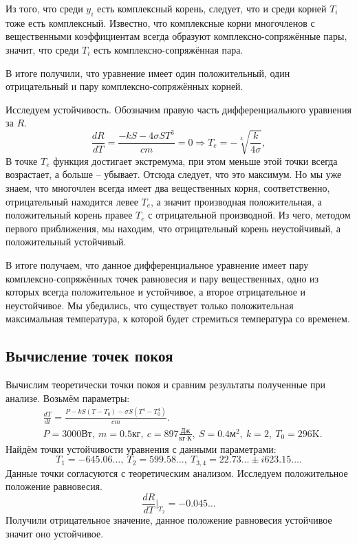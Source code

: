     Из того, что среди $ y_i $ есть комплексный корень, следует, что и среди корней $ T_i $ тоже есть комплексный. Известно, что комплексные корни многочленов с вещественными коэффициентам всегда образуют комплексно-сопряжённые пары, значит, что среди $ T_i $ есть комплексно-сопряжённая пара.

    В итоге получили, что уравнение имеет один положительный, один отрицательный и пару комплексно-сопряжённых корней.

    Исследуем устойчивость. Обозначим правую часть дифференциального уравнения за $ R $.
    \[
        \frac{dR}{dT} = \frac{-kS - 4\sigma S T^3}{cm} = 0 \Rightarrow T_e = -\sqrt[3]{\frac{k}{4 \sigma}},
    \]
    В точке $ T_e $ функция достигает экстремума, при этом меньше этой точки всегда возрастает, а больше -- убывает. Отсюда следует, что это максимум. Но мы уже знаем, что многочлен всегда имеет два вещественных корня, соответственно, отрицательный находится левее $ T_e $, а значит производная положительная, а положительный корень правее $ T_e $ с отрицательной производной. Из чего, методом первого приближения, мы находим, что отрицательный корень неустойчивый, а положительный устойчивый. 

    В итоге получаем, что данное дифференциальное уравнение имеет пару комплексно-сопряжённых точек равновесия и пару вещественных, одно из которых всегда положительное и устойчивое, а второе отрицательное и неустойчивое. Мы убедились, что существует только положительная максимальная температура, к которой будет стремиться температура со временем.

    \subsection{Вычисление точек покоя}
        Вычислим теоретически точки покоя и сравним результаты полученные при анализе. Возьмём параметры:
        \[
            \begin{split}
                & \frac{dT}{dt} = \frac{P - k S (T - T_0) - \sigma S (T^4 - T_0^4)}{cm}. \\
                & P = 3000 \text{Вт}, ~ m = 0.5 \text{кг}, ~ c = 897 \frac{\text{Дж}}{\text{кг} \cdot \text{К}}, ~ S = 0.4 \text{м}^2, ~ k = 2, ~ T_0 = 296 \text{K}.
            \end{split}
        \]
        Найдём точки устойчивости уравнения с данными параметрами:
        \[
            T_1 = -645.06\dots, ~
            T_2 = 599.58\dots, ~
            T_{3,4} = 22.73\dots \pm i 623.15\dots.
        \]
        Данные точки согласуются с теоретическим анализом.
        Исследуем положительное положение равновесия.
        \[
            \frac{dR}{dT}\big|_{T_2} = -0.045\dots
        \]
        Получили отрицательное значение, данное положение равновесия устойчивое значит оно устойчивое.